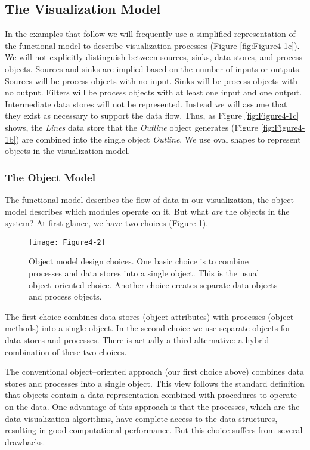 \subsection{The Visualization Model}
\label{subsec:the_visualization_model}

In the examples that follow we will frequently use a simplified representation of the functional model to describe visualization processes (Figure \ref{fig:Figure4-1c}). We will not explicitly distinguish between sources, sinks, data stores, and process objects. Sources and sinks are implied based on the number of inputs or outputs. Sources will be process objects with no input. Sinks will be process objects with no output. Filters will be process objects with at least one input and one output. Intermediate data stores will not be represented. Instead we will assume that they exist as necessary to support the data flow. Thus, as Figure \ref{fig:Figure4-1c} shows, the \emph{Lines} data store that the \emph{Outline} object generates (Figure \ref{fig:Figure4-1b}) are combined into the single object \emph{Outline}. We use oval shapes to represent objects in the visualization model.

\subsubsection{The Object Model}

The functional model describes the flow of data in our visualization,
the object model describes which modules operate on it. But what \emph{are} the objects in the system? At first glance, we have two choices (Figure \ref{fig:Figure4-2}).

\begin{figure}[!htb]
  \centering
  \texttt{[image: Figure4-2]}\\
  \caption{Object model design choices. One basic choice is to combine processes and data stores into a single object. This is the usual object--oriented choice. Another choice creates separate data objects and process objects.}\label{fig:Figure4-2}
\end{figure}

The first choice combines data stores (object attributes) with processes (object methods) into a single object. In the second choice we use separate objects for data stores and processes. There is actually a third alternative: a hybrid combination of these two choices.

The conventional object--oriented approach (our first choice above) combines data stores and processes into a single object. This view follows the standard definition that objects contain a data representation combined with procedures to operate on the data. One advantage of this approach is that the processes, which are the data visualization algorithms, have complete access to the data structures, resulting in good computational performance. But this choice suffers from several drawbacks.

